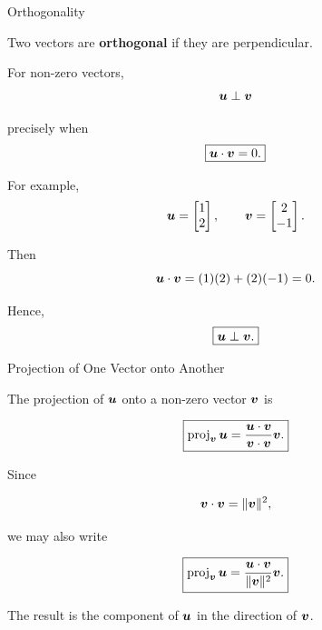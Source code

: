 \begin{frame}{Orthogonality}

Two vectors are \textbf{orthogonal} if they are perpendicular.

For non-zero vectors,
\vspace{-0.1cm}
\[
\bm{u}\perp\bm{v}
\]

precisely when
\vspace{-0.1cm}
\[
\boxed{
\bm{u}\cdot\bm{v}=0.
}
\]

For example,
\vspace{-0.1cm}
\[
\bm{u}
=
\begin{bmatrix}
1\\
2
\end{bmatrix},
\qquad
\bm{v}
=
\begin{bmatrix}
2\\
-1
\end{bmatrix}.
\]

Then
\vspace{-0.1cm}
\[
\bm{u}\cdot\bm{v}
=
(1)(2)+(2)(-1)
=
0.
\]

Hence,
\vspace{-0.1cm}
\[
\boxed{
\bm{u}\perp\bm{v}.
}
\]

\end{frame}



\begin{frame}{Projection of One Vector onto Another}

The projection of $\bm{u}$ onto a non-zero vector $\bm{v}$ is

\[
\boxed{
\operatorname{proj}_{\bm{v}}\bm{u}
=
\frac{\bm{u}\cdot\bm{v}}
{\bm{v}\cdot\bm{v}}
\bm{v}.
}
\]

Since

\[
\bm{v}\cdot\bm{v}
=
\|\bm{v}\|^2,
\]

we may also write

\[
\boxed{
\operatorname{proj}_{\bm{v}}\bm{u}
=
\frac{\bm{u}\cdot\bm{v}}
{\|\bm{v}\|^2}
\bm{v}.
}
\]

The result is the component of $\bm{u}$ in the direction
of $\bm{v}$.

\end{frame}




